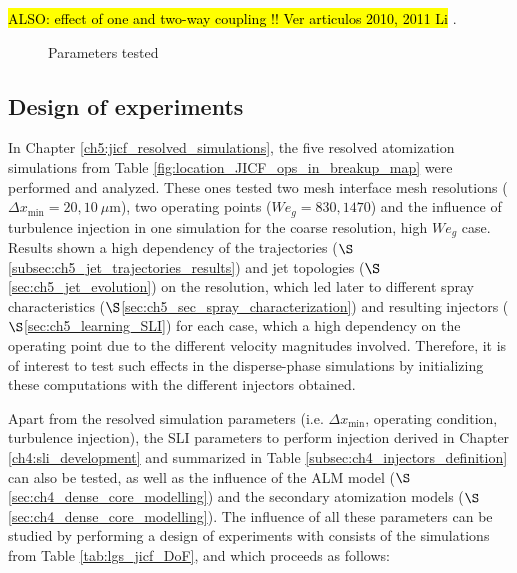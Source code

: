 \hl{ALSO: effect of one and two-way coupling !! Ver articulos 2010, 2011 Li }.

%
\begin{figure}[h!]	
	\centering
	\caption{Parameters tested}
	\label{fig:dispersed_phase_sli_parameters}
\end{figure}


\subsection{Design of experiments}

In Chapter \ref{ch5:jicf_resolved_simulations}, the five resolved atomization simulations from Table \ref{fig:location_JICF_ops_in_breakup_map} were performed and analyzed. These ones tested two mesh interface mesh resolutions ($\Delta x_\mathrm{min} = 20, 10~\mu$m), two operating points ($We_g = 830, 1470$) and the influence of turbulence injection in one simulation for the coarse resolution, high $We_g$ case. Results shown a high dependency of the trajectories ($\S$\ref{subsec:ch5_jet_trajectories_results}) and jet topologies ($\S$\ref{sec:ch5_jet_evolution}) on the resolution, which led later to different spray characteristics ($\S$\ref{sec:ch5_sec_spray_characterization}) and resulting injectors ($\S$\ref{sec:ch5_learning_SLI}) for each case, which a high dependency on the operating point due to the different velocity magnitudes involved. Therefore, it is of interest to test such effects in the disperse-phase simulations by initializing these computations with the different injectors obtained.

Apart from the resolved simulation parameters (i.e. $\Delta x_\mathrm{min}$, operating condition, turbulence injection), the SLI parameters to perform injection derived in Chapter \ref{ch4:sli_development} and summarized in Table \ref{subsec:ch4_injectors_definition} can also be tested, as well as the influence of the ALM model ($\S$\ref{sec:ch4_dense_core_modelling}) and the secondary atomization models ($\S$\ref{sec:ch4_dense_core_modelling}). The influence of all these parameters can be studied by performing a design of experiments with consists of the simulations from Table \ref{tab:lgs_jicf_DoF}, and which proceeds as follows: 


